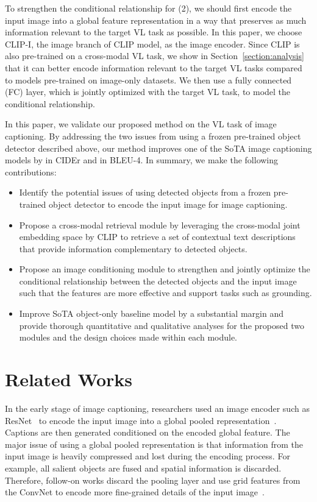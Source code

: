 \documentclass[10pt,twocolumn,letterpaper]{article}
\begin{document}
To strengthen the conditional relationship for (2), we should first encode the input image into a global feature representation in a way that preserves as much information relevant to the target VL task as possible.
In this paper, we choose CLIP-I, the image branch of CLIP model, as the image encoder.
Since CLIP is also pre-trained on a cross-modal VL task, we show in Section~\ref{section:analysis} that it can better encode information relevant to the target VL tasks compared to models pre-trained on image-only datasets.
We then use a fully connected (FC) layer, which is jointly optimized with the target VL task, to model the conditional relationship.

In this paper, we validate our proposed method on the VL task of image captioning.
By addressing the two issues from using a frozen pre-trained object detector described above, our method improves one of the SoTA image captioning models  by  in CIDEr and  in BLEU-4.
In summary, we make the following contributions:\begin{itemize}[topsep=0pt,itemsep=-1ex,partopsep=1ex,parsep=1ex,labelindent=0.0em,labelsep=0.2cm,leftmargin=*]
\item Identify the potential issues of using detected objects from a frozen pre-trained object detector to encode the input image for image captioning.
\item Propose a cross-modal retrieval module by leveraging the cross-modal joint embedding space by CLIP to retrieve a set of contextual text descriptions that provide information complementary to detected objects.
\item Propose an image conditioning module to strengthen and jointly optimize the conditional relationship between the detected objects and the input image such that the features are more effective and support tasks such as grounding.  \item Improve SoTA object-only baseline model by a substantial margin and provide thorough quantitative and qualitative analyses for the proposed two modules and the design choices made within each module.
\end{itemize}

 \section{Related Works}

In the early stage of image captioning, researchers used an image encoder such as ResNet~\cite{he2016deep} to encode the input image into a global pooled representation~\cite{vinyals2015show,karpathy2015deep,mao2014deep,donahue2015long,chen2015mind,fang2015captions,jia2015guiding,you2016image,wu2016value,gu2017empirical,chen2017structcap,chen2018groupcap}.
Captions are then generated conditioned on the encoded global feature.
The major issue of using a global pooled representation is that information from the input image is heavily compressed and lost during the encoding process.
For example, all salient objects are fused and spatial information is discarded.
Therefore, follow-on works discard the pooling layer and use grid features from the ConvNet to encode more fine-grained details of the input image~\cite{rennie2017self,xu2015show,lu2017knowing,chen2017sca,jiang2018recurrent}.
\end{document}
